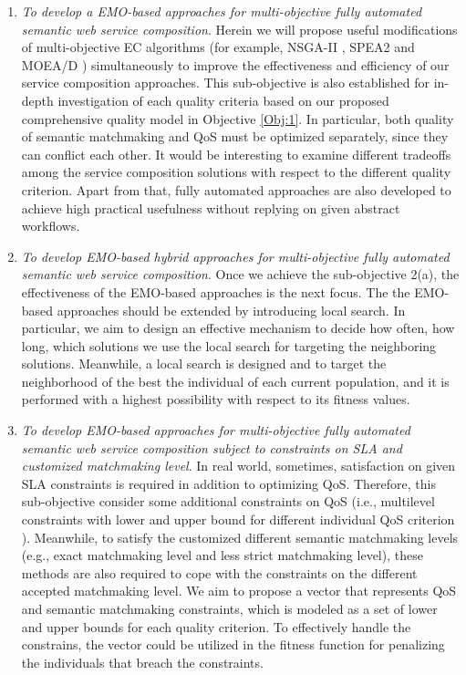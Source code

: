 \begin{enumerate}
\begin{enumerate}
    \item \label{Obj:2.1} \emph{To develop a EMO-based approaches for multi-objective fully automated semantic web service composition}. Herein we will propose useful modifications of multi-objective EC algorithms (for example, NSGA-II \cite{deb2002fast}, SPEA2 \cite{zitzler2001spea2} and MOEA/D \cite{zhang2007moea}) simultaneously to improve the effectiveness and efficiency of our service composition approaches. This sub-objective is also established for in-depth investigation of each quality criteria based on our proposed comprehensive quality model in Objective \ref{Obj:1}.  In particular, both quality of semantic matchmaking and QoS must be optimized separately, since they can conflict each other. It would be interesting to examine different tradeoffs among the service composition solutions with respect to the different quality criterion. Apart from that, fully automated approaches are also developed to achieve high practical usefulness without replying on given abstract workflows.
   
    \item \emph{To develop EMO-based hybrid approaches for multi-objective fully automated semantic web service composition}. Once we achieve the sub-objective 2(a), the effectiveness of the EMO-based approaches is the next focus. The the EMO-based approaches should be extended by introducing local search. In particular, we aim to design an effective mechanism to decide how often, how long, which solutions we use the local search for targeting the neighboring solutions. Meanwhile, a local search is designed and to target the neighborhood of the best the individual of each current population, and it is performed with a highest possibility with respect to its fitness values. 

    \item \emph{To develop EMO-based approaches for multi-objective fully automated semantic web service composition subject to constraints on SLA and customized matchmaking level}. In real world, sometimes, satisfaction on given SLA constraints is required in addition to optimizing QoS. Therefore, this sub-objective consider some additional constraints on  QoS (i.e., multilevel constraints with lower and upper bound for different individual QoS criterion \cite{yin2014hybrid}). Meanwhile, to satisfy the customized different semantic matchmaking levels (e.g., exact matchmaking level and less strict matchmaking level), these methods are also required to cope with the constraints on the different accepted matchmaking level. We aim to propose a vector that represents QoS and semantic matchmaking constraints, which is modeled as a set of lower and upper bounds for each quality criterion. To effectively handle the constrains, the vector could be utilized in the fitness function for penalizing the individuals that breach the constraints.


\end{enumerate}
\end{enumerate}
